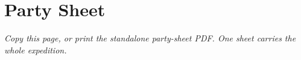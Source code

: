 \onecolumn
{}
\section{Party Sheet}

\vspace{-0.6em}
{\footnotesize\itshape Copy this page, or print the standalone party-sheet PDF. One sheet carries the whole expedition.}



\twocolumn
